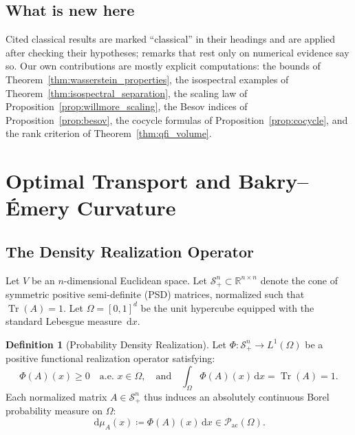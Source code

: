 \documentclass[11pt,a4paper,reqno]{amsart}
\theoremstyle{definition}
\newtheorem{definition}[theorem]{Definition}
\numberwithin{equation}{section}
\newcommand{\R}{\mathbb{R}}
\newcommand{\Tr}{\operatorname{Tr}}
\newcommand{\dif}{\,\mathrm{d}}
\begin{document}
\subsection*{What is new here}
Cited classical results are marked ``classical'' in their headings and are applied after checking their hypotheses; remarks that rest only on numerical evidence say so. Our own contributions are mostly explicit computations: the bounds of Theorem~\ref{thm:wasserstein_properties}, the isospectral examples of Theorem~\ref{thm:isospectral_separation}, the scaling law of Proposition~\ref{prop:willmore_scaling}, the Besov indices of Proposition~\ref{prop:besov}, the cocycle formulas of Proposition~\ref{prop:cocycle}, and the rank criterion of Theorem~\ref{thm:qfi_volume}.

\section{Optimal Transport and Bakry--\'Emery Curvature}
\label{sec:optimal_transport}

\subsection{The Density Realization Operator}
Let $V$ be an $n$-dimensional Euclidean space. Let $\mathcal{S}_+^n \subset \R^{n \times n}$ denote the cone of symmetric positive semi-definite (PSD) matrices, normalized such that $\Tr(A) = 1$. Let $\Omega = [0, 1]^d$ be the unit hypercube equipped with the standard Lebesgue measure $\dif x$.

\begin{definition}[Probability Density Realization]
Let $\Phi \colon \mathcal{S}_+^n \to L^1(\Omega)$ be a positive functional realization operator satisfying:
\begin{equation}
    \Phi(A)(x) \ge 0 \quad \text{a.e. } x \in \Omega, \quad \text{and} \quad \int_\Omega \Phi(A)(x) \dif x = \Tr(A) = 1.
\end{equation}
Each normalized matrix $A \in \mathcal{S}_+^n$ thus induces an absolutely continuous Borel probability measure on $\Omega$:
\begin{equation}
    \dif \mu_A(x) \coloneqq \Phi(A)(x) \dif x \in \mathcal{P}_{\mathrm{ac}}(\Omega).
\end{equation}
\end{definition}
\end{document}
